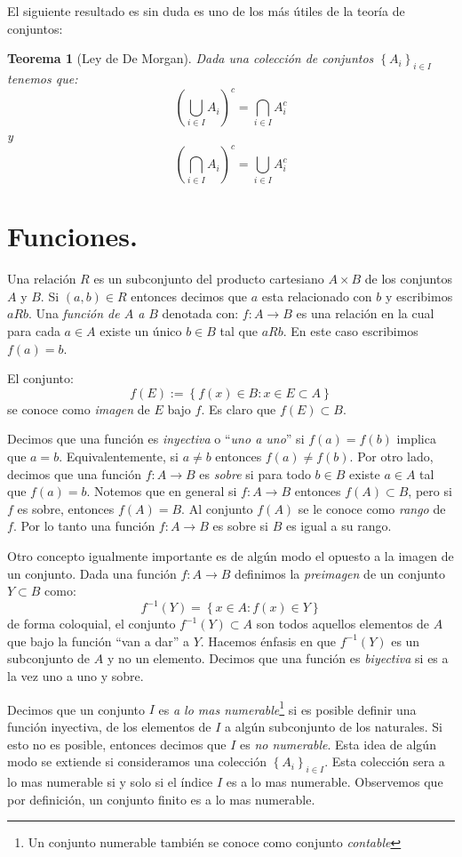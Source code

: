 \documentclass[14pt]{extbook}
\newtheorem{teo}{Teorema}
\begin{document}
El siguiente resultado es sin duda es uno de los más útiles de la teoría de conjuntos:
\begin{teo}[Ley de De Morgan]
Dada una colección de conjuntos $\left\{A_i\right\}_{i\in I}$ tenemos que:
$$
\left(\bigcup_{i\in I} A_i\right)^c =\bigcap_{i\in I} A_i^c
$$
y 
$$
\left(\bigcap_{i\in I} A_i\right)^c =\bigcup_{i\in I} A_i^c
$$
\end{teo}

\section{Funciones.}
Una relación $R$ es un subconjunto del producto cartesiano $A\times B$ de los conjuntos $A$ y $B$. Si $(a,b)\in R$ entonces decimos que $a$ esta relacionado con $b$ y escribimos $aRb$. Una \emph{función de $A$ a $B$} denotada con: $f:A\to B$ es una relación en la cual para cada $a\in A$ existe un único $b\in B$ tal que $aRb$. En este caso escribimos $f(a) = b$.

El conjunto:
$$
f(E) := \left\{f(x)\in B: x\in E\subset A\right\} 
$$
se conoce como \emph{imagen} de $E$ bajo $f$. Es claro que $f(E) \subset B$.

Decimos que una función es \emph{inyectiva} o ``\emph{uno a uno}'' si $f(a) = f(b)$ implica que $a=b$. Equivalentemente, si $a\neq b$ entonces $f(a)\neq f(b)$. Por otro lado, decimos que una función $f:A\rightarrow B$ es \emph{sobre} si para todo $b\in B$ existe $a\in A$ tal que $f(a)=b$. Notemos que en general si $f:A\rightarrow B$ entonces $f(A)\subset B$, pero si $f$ es sobre, entonces $f(A) = B$. Al conjunto $f(A)$ se le conoce como \emph{rango} de $f$. Por lo tanto una función $f:A\rightarrow B$ es sobre si $B$ es igual a su rango.

Otro concepto igualmente importante es de algún modo el opuesto a la imagen de un conjunto. Dada una función $f:A\rightarrow B$ definimos la \emph{preimagen} de un conjunto $Y \subset B$ como:
$$
f^{-1}(Y) = \left\{x\in A: f(x) \in Y\right\}
$$
de forma coloquial, el conjunto $f^{-1}(Y)\subset A$ son todos aquellos elementos de $A$ que bajo la función ``van a dar'' a $Y$. Hacemos énfasis en que $f^{-1}(Y)$ es un subconjunto de $A$ y no un elemento. Decimos que una función es \emph{biyectiva} si es a la vez uno a uno y sobre.

Decimos que un conjunto $I$ es \emph{a lo mas numerable}\footnote{Un conjunto numerable también se conoce como conjunto \emph{contable}} si es posible definir una función inyectiva, de los elementos de $I$ a algún subconjunto de los naturales. Si esto no es posible, entonces decimos que $I$ es \emph{no numerable}. Esta idea de algún modo se extiende si consideramos una colección $\left\{A_i\right\}_{i\in I}$. Esta colección sera a lo mas numerable si y solo si el índice $I$ es a lo mas numerable. Observemos que por definición, un conjunto finito es a lo mas numerable.
\end{document}
